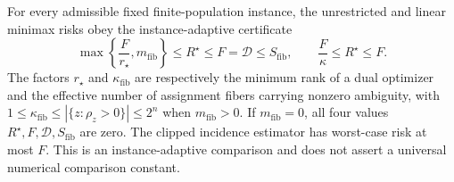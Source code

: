 For every admissible fixed finite-population instance, the unrestricted and linear minimax risks obey the instance-adaptive certificate
\[
 \max\left\{\frac{F}{r_{\star}},m_{\mathrm{fib}}\right\}
 \le R^{\star}\le F=\mathcal D\le S_{\mathrm{fib}},
 \qquad
 \frac{F}{\kappa}\le R^{\star}\le F.
\]
The factors \(r_{\star}\) and \(\kappa_{\mathrm{fib}}\) are respectively the minimum rank of a dual optimizer and the effective number of assignment fibers carrying nonzero ambiguity, with \(1\le\kappa_{\mathrm{fib}}\le|\{z:\rho_z>0\}|\le2^n\) when \(m_{\mathrm{fib}}>0\). If \(m_{\mathrm{fib}}=0\), all four values \(R^{\star},F,\mathcal D,S_{\mathrm{fib}}\) are zero. The clipped incidence estimator has worst-case risk at most \(F\). This is an instance-adaptive comparison and does not assert a universal numerical comparison constant.